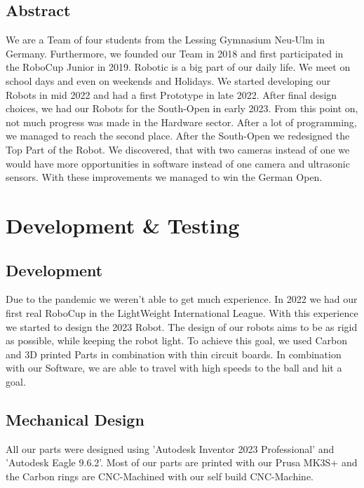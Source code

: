 \documentclass{scrartcl}
\begin{document}
\subsection{Abstract}
We are a Team of four students from the Lessing Gymnasium Neu-Ulm in Germany. Furthermore, we founded our Team
in 2018 and first participated in the RoboCup Junior in 2019. Robotic is a big part of our daily life.
We meet on school days and even on weekends and Holidays.
\newline
\newline
We started developing our Robots in mid 2022 and had a first Prototype in late 2022. After final design
choices, we had our Robots for the South-Open in early 2023. From this point on, not much progress was
made in the Hardware sector.
After a lot of programming, we managed to reach the second place.
\newline
After the South-Open we redesigned the Top Part of the Robot. We discovered, that with two cameras
instead of one we would have more opportunities in software instead of one camera and ultrasonic sensors.
With these improvements we managed to win the German Open.

\section{Development \& Testing}

\subsection{Development}
Due to the pandemic we weren't able to get much experience. In 2022 we had our first real RoboCup
in the LightWeight International League. With this experience we started to design the 2023 Robot.
\newline
The design of our robots aims to be as rigid as possible, while keeping the robot light.
To achieve this goal, we used Carbon and 3D printed Parts in combination with thin circuit boards.
In combination with our Software, we are able to travel with high speeds to the ball and
hit a goal.

\subsection{Mechanical Design}
All our parts were designed using 'Autodesk Inventor 2023 Professional' and 'Autodesk Eagle 9.6.2'.
Most of our parts are printed with our Prusa MK3S+ and the Carbon rings are CNC-Machined
with our self build CNC-Machine.
\newline
\newline
\end{document}
